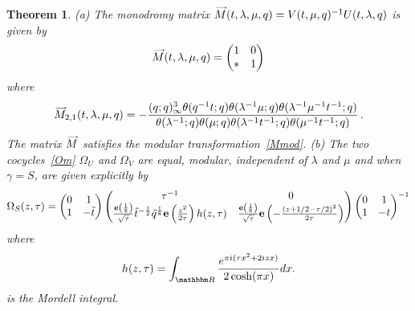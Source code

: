 \documentclass[12pt,reqno]{amsart}
\newtheorem{theorem}{Theorem}[section]
\theoremstyle{definition}
\def\BR{\mathbbm R}
\def\tq{\tilde{q}}
\def\be{\begin{equation}}
\def\ee{\end{equation}}
\def\e{\bold e}
\def\Om{\Omega}
\def\vM{\accentset{\longrightarrow}{M}}
\begin{document}
\begin{theorem}
\label{thm.ex2}
{\rm (a)}
The monodromy matrix $\vM(t,\lambda,\mu,q)=V(t,\mu,q)^{-1}U(t,\lambda,q)$ is
given by
\be
\label{Mex2b}
\vM(t,\lambda,\mu,q) =
\begin{pmatrix}
1 & 0\\
* & 1\\
\end{pmatrix}
\ee
where 
\be
\label{M12ex2}
\vM_{2,1}(t,\lambda,\mu,q) =
-\frac{(q;q)_{\infty}^{3}\theta(q^{-1}t;q)\theta(\lambda ^{-1}\mu ;q)
  \theta(\lambda ^{-1}\mu ^{-1}t^{-1};q)}{\theta(\lambda ^{-1};q)\theta(\mu ;q)
  \theta(\lambda ^{-1}t^{-1};q)\theta(\mu ^{-1}t^{-1};q)} \,.
\ee
The matrix $\vM$ satisfies the modular transformation~\eqref{Mmod}.
\newline
{\rm (b)}
The two cocycles~\eqref{Om} $\Om_U$ and $\Om_V$ are equal, modular, 
independent of $\lambda$ and $\mu$ and when $\gamma=S$, are given explicitly
by
\be
\Om_{S}(z,\tau)
=
\begin{pmatrix}
0 & 1\\
1 & -\tilde{t}
\end{pmatrix}
\begin{pmatrix}
\tau^{-1} & 0\\
\frac{\e\left(\frac{1}{8}\right)}{\sqrt{\tau}}\tilde{t}^{-\frac{1}{2}}
\tq^{\frac{1}{8}}\e\left(\frac{z^2}{2\tau}\right)h(z,\tau) &
\frac{\e\left(\frac{1}{8}\right)}{\sqrt{\tau}}\e
\left(-\frac{(z+1/2-\tau/2)^{2}}{2\tau}\right)
\end{pmatrix}
\begin{pmatrix}
0 & 1\\
1 & -t
\end{pmatrix}^{-1}
\ee
where
\be
\label{mordell}
h(z,\tau)=\int_{\BR}\frac{e^{\pi i (\tau x^{2} + 2 i z x)}}{2\cosh(\pi x)}dx.
\ee
is the Mordell integral. 
\end{theorem}
\end{document}
